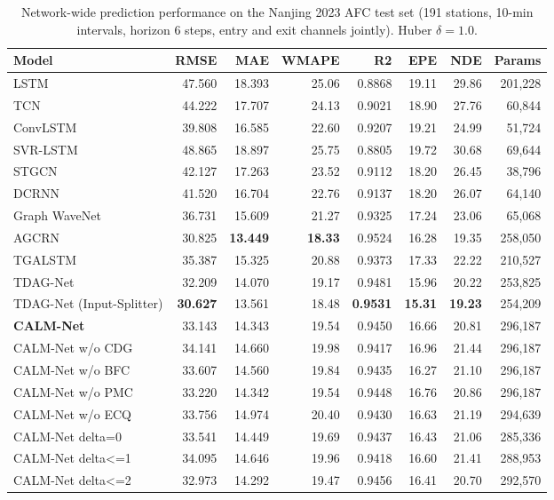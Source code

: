 \begin{table}[!t]
\caption{Network-wide prediction performance on the Nanjing 2023 AFC test set (191 stations, 10-min intervals, horizon 6 steps, entry and exit channels jointly). Huber $\delta=1.0$.}
\label{tab:main_results}
\centering
\footnotesize
\begin{tabular}{lrrrrrrr}
\toprule
Model & RMSE & MAE & WMAPE & R2 & EPE & NDE & Params \\
\midrule
LSTM & 47.560 & 18.393 & 25.06 & 0.8868 & 19.11 & 29.86 & 201,228 \\
TCN & 44.222 & 17.707 & 24.13 & 0.9021 & 18.90 & 27.76 & 60,844 \\
ConvLSTM & 39.808 & 16.585 & 22.60 & 0.9207 & 19.21 & 24.99 & 51,724 \\
SVR-LSTM & 48.865 & 18.897 & 25.75 & 0.8805 & 19.72 & 30.68 & 69,644 \\
STGCN & 42.127 & 17.263 & 23.52 & 0.9112 & 18.20 & 26.45 & 38,796 \\
DCRNN & 41.520 & 16.704 & 22.76 & 0.9137 & 18.20 & 26.07 & 64,140 \\
Graph WaveNet & 36.731 & 15.609 & 21.27 & 0.9325 & 17.24 & 23.06 & 65,068 \\
AGCRN & 30.825 & \textbf{13.449} & \textbf{18.33} & 0.9524 & 16.28 & 19.35 & 258,050 \\
TGALSTM & 35.387 & 15.325 & 20.88 & 0.9373 & 17.33 & 22.22 & 210,527 \\
TDAG-Net & 32.209 & 14.070 & 19.17 & 0.9481 & 15.96 & 20.22 & 253,825 \\
TDAG-Net (Input-Splitter) & \textbf{30.627} & 13.561 & 18.48 & \textbf{0.9531} & \textbf{15.31} & \textbf{19.23} & 254,209 \\
\textbf{CALM-Net} & 33.143 & 14.343 & 19.54 & 0.9450 & 16.66 & 20.81 & 296,187 \\
CALM-Net w/o CDG & 34.141 & 14.660 & 19.98 & 0.9417 & 16.96 & 21.44 & 296,187 \\
CALM-Net w/o BFC & 33.607 & 14.560 & 19.84 & 0.9435 & 16.27 & 21.10 & 296,187 \\
CALM-Net w/o PMC & 33.220 & 14.342 & 19.54 & 0.9448 & 16.76 & 20.86 & 296,187 \\
CALM-Net w/o ECQ & 33.756 & 14.974 & 20.40 & 0.9430 & 16.63 & 21.19 & 294,639 \\
CALM-Net delta=0 & 33.541 & 14.449 & 19.69 & 0.9437 & 16.43 & 21.06 & 285,336 \\
CALM-Net delta<=1 & 34.095 & 14.646 & 19.96 & 0.9418 & 16.60 & 21.41 & 288,953 \\
CALM-Net delta<=2 & 32.973 & 14.292 & 19.47 & 0.9456 & 16.41 & 20.70 & 292,570 \\
\bottomrule
\end{tabular}
\end{table}

